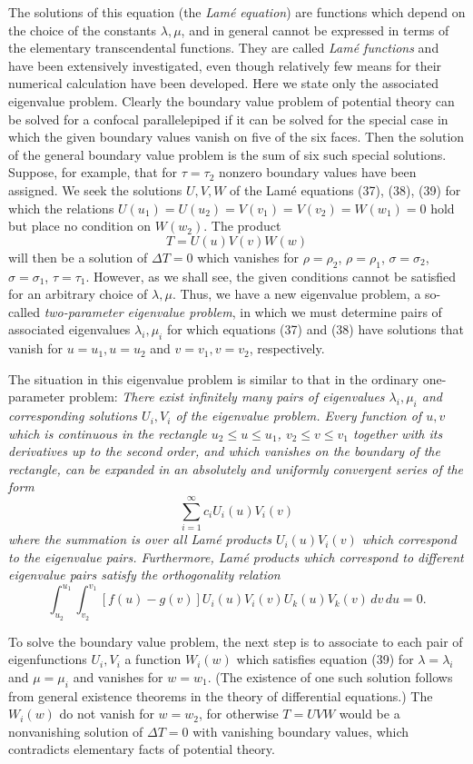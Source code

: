The solutions of this equation (the \emph{Lam\'e equation}) are functions which depend on the choice of the constants $\lambda,\mu$, and in general cannot be expressed in terms of the elementary transcendental functions. They are called \emph{Lam\'e functions} and have been extensively investigated, even though relatively few means for their numerical calculation have been developed. Here we state only the associated eigenvalue problem. Clearly the boundary value problem of potential theory can be solved for a confocal parallelepiped if it can be solved for the special case in which the given boundary values vanish on five of the six faces. Then the solution of the general boundary value problem is the sum of six such special solutions. Suppose, for example, that for $\tau=\tau_2$ nonzero boundary values have been assigned. We seek the solutions $U,V,W$ of the Lam\'e equations (37), (38), (39) for which the relations $U(u_1)=U(u_2)=V(v_1)=V(v_2)=W(w_1)=0$ hold but place no condition on $W(w_2)$. The product
\[
T=U(u)V(v)W(w)
\]
will then be a solution of $\Delta T=0$ which vanishes for $\rho=\rho_2$, $\rho=\rho_1$, $\sigma=\sigma_2$, $\sigma=\sigma_1$, $\tau=\tau_1$. However, as we shall see, the given conditions cannot be satisfied for an arbitrary choice of $\lambda,\mu$. Thus, we have a new eigenvalue problem, a so-called \emph{two-parameter eigenvalue problem}, in which we must determine pairs of associated eigenvalues $\lambda_i,\mu_i$ for which equations (37) and (38) have solutions that vanish for $u=u_1,u=u_2$ and $v=v_1,v=v_2$, respectively.

The situation in this eigenvalue problem is similar to that in the ordinary one-parameter problem: \emph{There exist infinitely many pairs of eigenvalues $\lambda_i,\mu_i$ and corresponding solutions $U_i,V_i$ of the eigenvalue problem. Every function of $u,v$ which is continuous in the rectangle $u_2\le u\le u_1$, $v_2\le v\le v_1$ together with its derivatives up to the second order, and which vanishes on the boundary of the rectangle, can be expanded in an absolutely and uniformly convergent series of the form}
\[
\sum_{i=1}^{\infty}c_iU_i(u)V_i(v)
\]
\emph{where the summation is over all Lam\'e products $U_i(u)V_i(v)$ which correspond to the eigenvalue pairs. Furthermore, Lam\'e products which correspond to different eigenvalue pairs satisfy the orthogonality relation}
\[
\int_{u_2}^{u_1}\int_{v_2}^{v_1}[f(u)-g(v)]U_i(u)V_i(v)U_k(u)V_k(v)\,dv\,du=0.
\]

To solve the boundary value problem, the next step is to associate to each pair of eigenfunctions $U_i,V_i$ a function $W_i(w)$ which satisfies equation (39) for $\lambda=\lambda_i$ and $\mu=\mu_i$ and vanishes for $w=w_1$. (The existence of one such solution follows from general existence theorems in the theory of differential equations.) The $W_i(w)$ do not vanish for $w=w_2$, for otherwise $T=UVW$ would be a nonvanishing solution of $\Delta T=0$ with vanishing boundary values, which contradicts elementary facts of potential theory.

